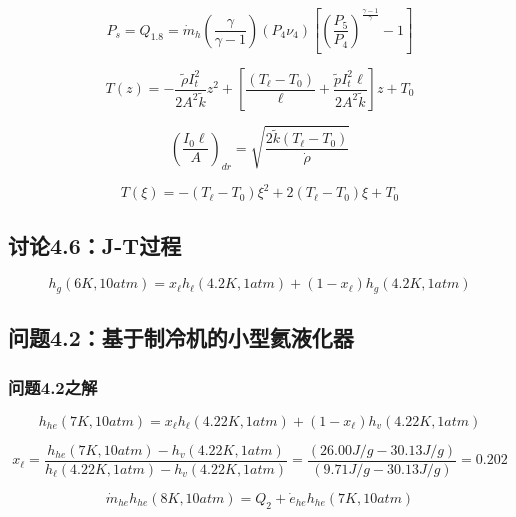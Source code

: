 \begin{equation}%
P_s=Q_{1.8}=\dot{m}_h(\frac{\gamma}{\gamma-1})(P_4\nu_4)[(\frac{P_5}{P_4})^{\frac{\gamma-1}{\gamma}}-1]
\end{equation}

\begin{equation}%
T(z)=-\frac{\tilde{\rho}I_{t}^{2}}{2A^2\tilde{k}}z^2+[\frac{(T_\ell-T_0)}{\ell}+\frac{\tilde{p}I_{t}^2\ell}{2A^2\tilde{k}}]z+T_0
\end{equation}

\begin{equation}%
(\frac{I_0\ell}{A})_{dr}=\sqrt{\frac{2\tilde{k}(T_\ell-T_0)}{\dot{\rho}}}
\end{equation}

\begin{equation}%
T(\xi)=-(T_\ell-T_0)\xi^2+2(T_\ell-T_0)\xi+T_0
\end{equation}

\subsection{讨论4.6：J-T过程}

\begin{equation}%
h_g(6K,10atm)=x_\ell h_\ell(4.2K,1atm)+(1-x_\ell)h_g(4.2K,1atm)
\end{equation}

\subsection{问题4.2：基于制冷机的小型氦液化器}


\subsubsection{问题4.2之解}

\begin{equation*}%
h_{he}(7K,10atm)=x_\ell h_\ell(4.22K,1atm)+(1-x_\ell)h_v(4.22K,1atm)
\end{equation*}

\begin{equation*}%
x_\ell=\frac{h_{he}(7K,10atm)-h_v(4.22K,1atm)}{h_\ell(4.22K,1atm)-h_v(4.22K,1atm)}
=\frac{(26.00J/g-30.13J/g)}{(9.71J/g-30.13J/g)}=0.202
\end{equation*}

\begin{equation*}%
\dot{m}_{he}h_{he}(8K,10atm)=Q_2+\dot{e}_{he}h_{he}(7K,10atm)
\end{equation*}

